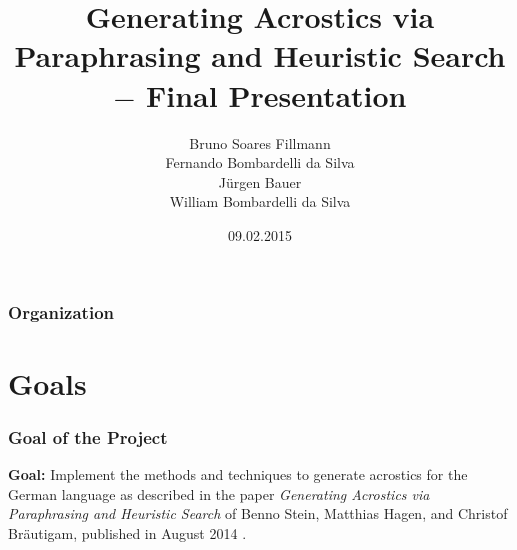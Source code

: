 \documentclass{beamer}
\title[Generating Acrostics via Paraphrasing and Heuristic Search]{Generating Acrostics via Paraphrasing and Heuristic Search $-$ Final Presentation} %
\author[Bruno, Fernando, Jürgen, William]{Bruno Soares Fillmann\\
Fernando Bombardelli da Silva\\
Jürgen Bauer\\
William Bombardelli da Silva
} %
\institute[TU Berlin] %
{
Technische Universität Berlin \\ %
Datenbanksysteme und Informationsmanagement \\
DBPRO – Database Projects (WS 2014/2015) \\
\medskip
}
\date{09.02.2015} %
\begin{document}
\begin{frame}
\titlepage %
\end{frame}

\begin{frame}
\frametitle{Organization} %
\tableofcontents %
\end{frame}


\section{Goals} %

\begin{frame}
\frametitle{Goal of the Project}
\textbf{Goal:} Implement the methods and techniques to generate acrostics for the German language as described in the paper \emph{Generating Acrostics via Paraphrasing and Heuristic Search} of Benno Stein, Matthias Hagen, and Christof Bräutigam, published in August 2014 \cite{Stein}.
	
\end{frame}
\end{document}
